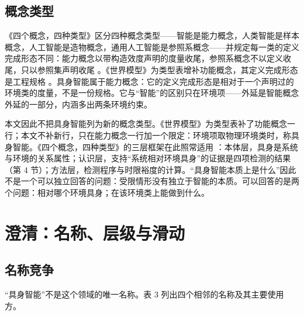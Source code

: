\documentclass[10pt,fontset=fandol]{ctexart}
\begin{document}
\subsection{概念类型}

《四个概念，四种类型》区分四种概念类型——智能是能力概念，人类智能是样本概念，人工智能是造物概念，通用人工智能是参照系概念——并规定每一类的定义完成形态不同：能力概念以带构造效度声明的度量收尾，参照系概念不以定义收尾，只以参照集声明收尾 \cite{yu2026four}。《世界模型》为类型表增补功能概念，其定义完成形态是工程规格 \cite{yu2026wm}。具身智能属于能力概念：它的定义完成形态是相对于一个声明过的环境类的度量，不是一份规格。它与“智能”的区别只在环境项——外延是智能概念外延的一部分，内涵多出两条环境约束。

本文因此不把具身智能列为新的概念类型。《世界模型》为类型表补了功能概念一行；本文不补新行，只在能力概念一行加一个限定：环境项取物理环境类时，称具身智能。《四个概念，四种类型》的三层框架在此照常适用 \cite{yu2026four}：本体层，具身是系统与环境的关系属性；认识层，支持“系统相对环境具身”的证据是四项检测的结果（第 4 节）；方法层，检测程序与时限裕度的计算。“具身智能本质上是什么”因此不是一个可以独立回答的问题：受限情形没有独立于智能的本质。可以回答的是两个问题：相对哪个环境具身；在该环境类上能做到什么。

\section{澄清：名称、层级与滑动}\label{sec:s3}

\subsection{名称竞争}

“具身智能”不是这个领域的唯一名称。表 3 列出四个相邻的名称及其主要使用方。
\end{document}
